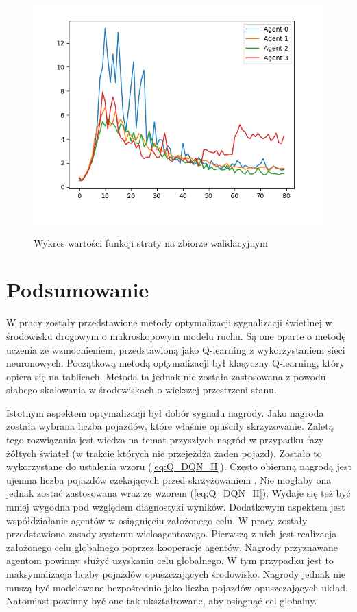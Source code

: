 \documentclass[12pt]{book}
\theoremstyle{plain}
\newcommand{\myref}[1]{(\ref{#1})}
\begin{document}
\begin{figure}[H]
	\centering
	\includegraphics[width=14cm]{images/poli_wyniki/losses_no_title}
	\label{fig:losses}
	\caption{Wykres wartości funkcji straty na zbiorze walidacyjnym}
	\centering
\end{figure}

\chapter{Podsumowanie}

\indent \indent W pracy zostały przedstawione metody optymalizacji sygnalizacji świetlnej w środowisku drogowym o makroskopowym modelu ruchu. Są one oparte o metodę uczenia ze wzmocnieniem, przedstawioną jako Q-learning z wykorzystaniem sieci neuronowych. Początkową metodą optymalizacji był klasyczny Q-learning, który opiera się na tablicach. Metoda ta jednak nie została zastosowana z powodu słabego skalowania w środowiskach o większej przestrzeni stanu. 

Istotnym aspektem optymalizacji był dobór sygnału nagrody. Jako nagroda została wybrana liczba pojazdów, które właśnie opuściły skrzyżowanie. Zaletą tego rozwiązania jest wiedza na temat przyszłych nagród w przypadku fazy żółtych świateł (w trakcie których nie przejeżdża żaden pojazd). Zostało to wykorzystane do ustalenia wzoru \myref{eq:Q_DQN_II}. Często obieraną nagrodą jest ujemna liczba pojazdów czekających przed skrzyżowaniem \cite{rewards}. Nie mogłaby ona jednak zostać zastosowana wraz ze wzorem \myref{eq:Q_DQN_II}. Wydaje się  też być mniej wygodna pod względem diagnostyki wyników. Dodatkowym aspektem jest współdziałanie agentów w osiągnięciu założonego celu. W pracy \cite{wang2018cooperative} zostały przedstawione zasady systemu wieloagentowego. Pierwszą z nich jest realizacja założonego celu globalnego poprzez kooperacje agentów. Nagrody przyznawane agentom powinny służyć uzyskaniu celu globalnego. W tym przypadku jest to maksymalizacja liczby pojazdów opuszczających środowisko. Nagrody jednak nie muszą być modelowane bezpośrednio jako liczba pojazdów opuszczających układ. Natomiast powinny być one tak ukształtowane, aby osiągnąć cel globalny. 
\end{document}

